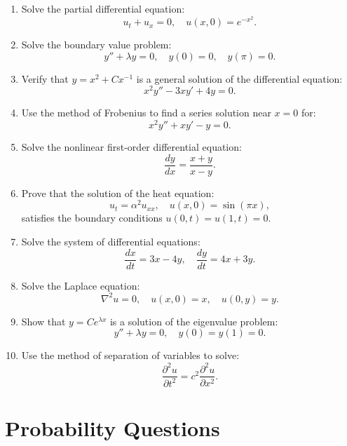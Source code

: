 \documentclass{article}
\begin{document}
\begin{enumerate}
    \item Solve the partial differential equation:
    \[
    u_t + u_x = 0, \quad u(x, 0) = e^{-x^2}.
    \]

    \item Solve the boundary value problem:
    \[
    y'' + \lambda y = 0, \quad y(0) = 0, \quad y(\pi) = 0.
    \]

    \item Verify that \( y = x^2 + Cx^{-1} \) is a general solution of the differential equation:
    \[
    x^2 y'' - 3x y' + 4y = 0.
    \]

    \item Use the method of Frobenius to find a series solution near \( x = 0 \) for:
    \[
    x^2 y'' + xy' - y = 0.
    \]

    \item Solve the nonlinear first-order differential equation:
    \[
    \frac{dy}{dx} = \frac{x + y}{x - y}.
    \]

    \item Prove that the solution of the heat equation:
    \[
    u_t = \alpha^2 u_{xx}, \quad u(x, 0) = \sin(\pi x),
    \]
    satisfies the boundary conditions \( u(0, t) = u(1, t) = 0 \).

    \item Solve the system of differential equations:
    \[
    \frac{dx}{dt} = 3x - 4y, \quad \frac{dy}{dt} = 4x + 3y.
    \]

    \item Solve the Laplace equation:
    \[
    \nabla^2 u = 0, \quad u(x, 0) = x, \quad u(0, y) = y.
    \]

    \item Show that \( y = Ce^{\lambda x} \) is a solution of the eigenvalue problem:
    \[
    y'' + \lambda y = 0, \quad y(0) = y(1) = 0.
    \]

    \item Use the method of separation of variables to solve:
    \[
    \frac{\partial^2 u}{\partial t^2} = c^2 \frac{\partial^2 u}{\partial x^2}.
    \]
\end{enumerate}

\section*{Probability Questions}
\end{document}
